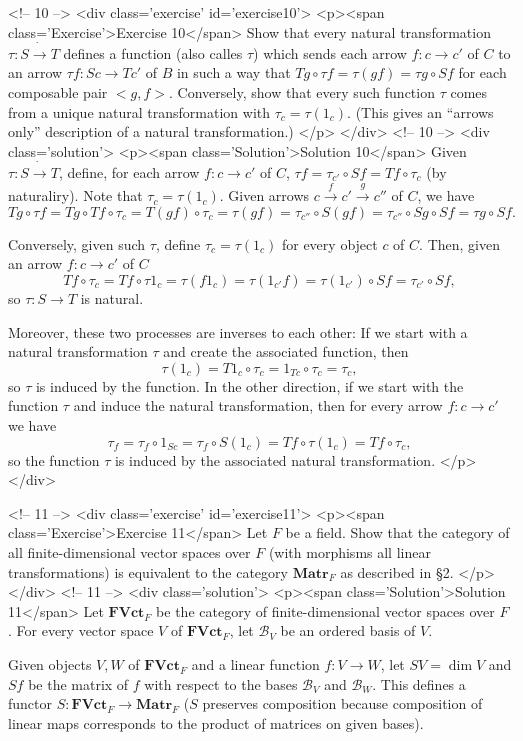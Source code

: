 <!-- 10 -->
<div class='exercise' id='exercise10'>
<p><span class='Exercise'>Exercise 10</span>
Show that every natural transformation $\tau:S\dot{\to} T$ defines a function (also calles $\tau$) which sends each arrow $f:c\to c'$ of $C$ to an arrow $\tau f:Sc\to Tc'$ of $B$ in such a way that $Tg\circ\tau f=\tau(gf)=\tau g\circ Sf$ for each composable pair $<g,f>$. Conversely, show that every such function $\tau$ comes from a unique natural transformation with $\tau_c=\tau(1_c)$. (This gives an ``arrows only'' description of a natural transformation.)
</p>
</div>
<!-- 10 -->
<div class='solution'>
<p><span class='Solution'>Solution 10</span>
Given $\tau:S\dot{\to} T$, define, for each arrow $f:c\to c'$ of $C$, $\tau f=\tau_{c'}\circ Sf=Tf\circ\tau_c$ (by naturaliry). Note that $\tau_c=\tau(1_c)$. Given arrows $c\overset{f}{\to}c'\overset{g}{\to}c''$ of $C$, we have
\[Tg\circ\tau f=Tg\circ Tf\circ \tau_c=T(gf)\circ\tau_c=\tau(gf)=\tau_{c''}\circ S(gf)=\tau_{c''}\circ Sg\circ Sf=\tau g\circ Sf.\]

Conversely, given such $\tau$, define $\tau_c=\tau(1_c)$ for every object $c$ of $C$. Then, given an arrow $f:c\to c'$ of $C$
\[Tf\circ\tau_c=Tf\circ\tau 1_c=\tau(f1_c)=\tau(1_{c'}f)=\tau(1_{c'})\circ Sf=\tau_{c'}\circ Sf,\]
so $\tau:S\to T$ is natural.

Moreover, these two processes are inverses to each other: If we start with a natural transformation $\tau$ and create the associated function, then \[\tau(1_c)=T1_c\circ\tau_c=1_{Tc}\circ\tau_c=\tau_c,\]
so $\tau$ is induced by the function. In the other direction, if we start with the function $\tau$ and induce the natural transformation, then for every arrow $f\colon c\to c'$ we have
\[\tau_f=\tau_f\circ 1_{Sc}=\tau_f\circ S(1_c)=Tf\circ \tau(1_c)=Tf\circ\tau_c,\]
so the function $\tau$ is induced by the associated natural transformation.
</p>
</div>

<!-- 11 -->
<div class='exercise' id='exercise11'>
<p><span class='Exercise'>Exercise 11</span>
Let $F$ be a field. Show that the category of all finite-dimensional vector spaces over $F$ (with morphisms all linear transformations) is equivalent to the category $\mathbf{Matr}_F$ as described in \S 2.
</p>
</div>
<!-- 11 -->
<div class='solution'>
<p><span class='Solution'>Solution 11</span>
Let $\mathbf{FVct}_F$ be the category of finite-dimensional vector spaces over $F$. For every vector space $V$ of $\mathbf{FVct}_F$, let $\mathscr{B}_V$ be an ordered basis of $V$.

Given objects $V,W$ of $\mathbf{FVct}_F$ and a linear function $f:V\to W$, let $SV=\dim V$ and $Sf$ be the matrix of $f$ with respect to the bases $\mathscr{B}_V$ and $\mathscr{B}_{W}$. This defines a functor $S:\mathbf{FVct}_F\to\mathbf{Matr}_F$ ($S$ preserves composition because composition of linear maps corresponds to the product of matrices on given bases).

